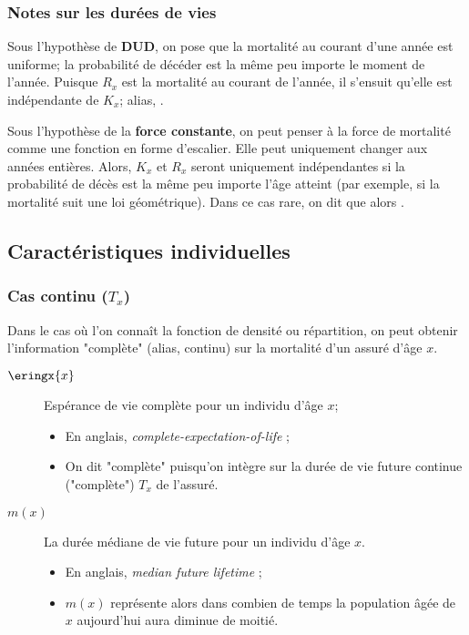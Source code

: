 \documentclass[10pt, french]{article}
\begin{document}
\begin{multicols*}{3}
\subsubsection*{Notes sur les durées de vies}

Sous l'hypothèse de \textbf{DUD}, on pose que la mortalité au courant d'une année est uniforme; la probabilité de décéder est la même peu importe le moment de l'année. Puisque $R_{x}$ est la mortalité au courant de l'année, il s'ensuit qu'elle est indépendante de $K_{x}$; alias, .

Sous l'hypothèse de la \textbf{force constante}, on peut penser à la force de mortalité comme une fonction en forme d'escalier. Elle peut uniquement changer aux années entières. Alors, $K_{x}$ et $R_{x}$ seront uniquement indépendantes si la probabilité de décès est la même peu importe l'âge atteint (par exemple, si la mortalité suit une loi géométrique). Dans ce cas rare, on dit que  alors .

\columnbreak
\subsection{Caractéristiques individuelles}

\subsubsection{Cas continu ($T_{x}$)}
Dans le cas où l'on connaît la fonction de densité ou répartition, on peut obtenir l'information "complète" (alias, continu) sur la mortalité d'un assuré d'âge $x$.

\begin{distributions}[Notation]
\begin{description}
	\item[$\eringx{x}$]	Espérance de vie complète pour un individu d'âge $x$;
		\begin{itemize}[leftmargin = *]
		\item	En anglais, \og \textit{complete-expectation-of-life} \fg{};
		\item	On dit "complète" puisqu'on intègre sur la durée de vie future continue ("complète") $T_{x}$ de l'assuré.
		\end{itemize}
	\item[$m(x)$]	La durée médiane de vie future pour un individu d'âge $x$.
		\begin{itemize}[leftmargin = *]
		\item	En anglais, \og \textit{median future lifetime} \fg{};
		\item	$m(x)$ représente alors dans combien de temps la population âgée de $x$ aujourd'hui aura diminue de moitié. 
		\end{itemize}
\end{description}
\end{distributions}


\end{multicols*}
\end{document}
